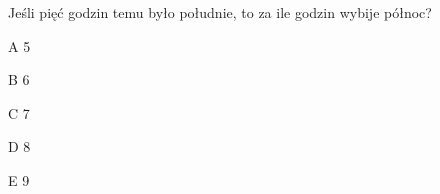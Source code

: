 \begin{tresc}
Jeśli pięć godzin temu było południe, to za ile godzin wybije północ?
\end{tresc}
\begin{wariant}{A} 5 \end{wariant}
\begin{wariant}{B} 6 \end{wariant}
\begin{wariant}{C} 7 \end{wariant}
\begin{wariant}{D} 8 \end{wariant}
\begin{wariant}{E} 9 \end{wariant}
